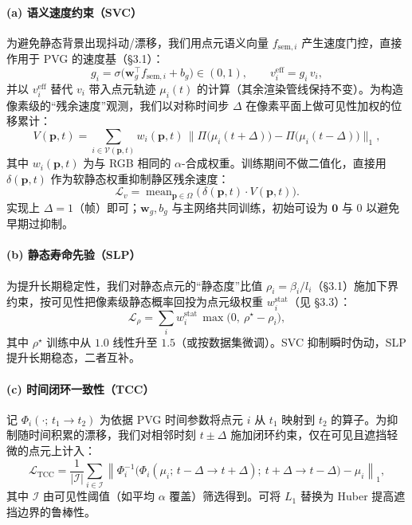 \documentclass[10pt,conference]{IEEEtran} %
\begin{document}
\paragraph{(a) 语义速度约束（SVC）}
为避免静态背景出现抖动/漂移，我们用点元语义向量 $f_{\mathrm{sem},i}$ 产生速度门控，直接作用于 PVG 的速度基（§3.1）：
\begin{equation}
g_i=\sigma\!\big(\mathbf{w}_g^\top f_{\mathrm{sem},i}+b_g\big)\in(0,1),\qquad
v_i^{\mathrm{eff}}=g_i\,v_i,
\label{eq:svc_gate}
\end{equation}
并以 $v_i^{\mathrm{eff}}$ 替代 $v_i$ 带入点元轨迹 $\mu_i(t)$ 的计算（其余渲染管线保持不变）。为构造像素级的“残余速度”观测，我们以对称时间步 $\Delta$ 在像素平面上做可见性加权的位移累计：
\begin{equation}
V(\mathbf p,t)=\sum_{i\in\mathcal V(\mathbf p,t)} w_i(\mathbf p,t)\,
\Big\|\Pi\!\big(\mu_i(t+\Delta)\big)-\Pi\!\big(\mu_i(t-\Delta)\big)\Big\|_1,
\label{eq:vel_map}
\end{equation}
其中 $w_i(\mathbf p,t)$ 为与 RGB 相同的 $\alpha$-合成权重。训练期间不做二值化，直接用 $\delta(\mathbf p,t)$ 作为软静态权重抑制静区残余速度：
\begin{equation}
\mathcal L_{v}=\operatorname{mean}_{\mathbf p\in\Omega}\!\big(\,\delta(\mathbf p,t)\cdot V(\mathbf p,t)\big).
\label{eq:svc_loss}
\end{equation}
实现上 $\Delta{=}1$（帧）即可；$\mathbf{w}_g,b_g$ 与主网络共同训练，初始可设为 $\mathbf{0}$ 与 $0$ 以避免早期过抑制。

\paragraph{(b) 静态寿命先验（SLP）}
为提升长期稳定性，我们对静态点元的“静态度”比值 $\rho_i=\beta_i/l_i$（§3.1）施加下界约束，按可见性把像素级静态概率回投为点元级权重 $w_i^{\mathrm{stat}}$（见 §3.3）：
\begin{equation}
\mathcal L_{\rho}=\sum_{i} w_i^{\mathrm{stat}}\,
\max\!\big(0,\ \rho^\star-\rho_i\big),
\label{eq:slp_loss}
\end{equation}
其中 $\rho^\star$ 训练中从 $1.0$ 线性升至 $1.5$（或按数据集微调）。SVC 抑制瞬时伪动，SLP 提升长期稳态，二者互补。

\paragraph{(c) 时间闭环一致性（TCC）}
记 $\Phi_i(\cdot;\,t_1\!\to\!t_2)$ 为依据 PVG 时间参数将点元 $i$ 从 $t_1$ 映射到 $t_2$ 的算子。为抑制随时间积累的漂移，我们对相邻时刻 $t\pm\Delta$ 施加闭环约束，仅在可见且遮挡轻微的点元上计入：
\begin{equation}
\mathcal L_{\mathrm{TCC}}
=\frac{1}{|\mathcal I|}\sum_{i\in\mathcal I}
\left\|
\Phi_i^{-1}\!\big(\Phi_i(\mu_i;\,t-\Delta\!\to\!t+\Delta);\ t+\Delta\!\to\!t-\Delta\big)-\mu_i
\right\|_1,
\label{eq:tcc}
\end{equation}
其中 $\mathcal I$ 由可见性阈值（如平均 $\alpha$ 覆盖）筛选得到。可将 $L_1$ 替换为 Huber 提高遮挡边界的鲁棒性。
\end{document}
